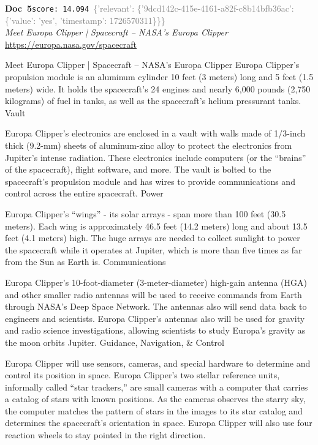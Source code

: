 \documentclass[a4paper,11pt]{article}
\begin{document}
\begin{docenv}
{\footnotesize\textcolor{doccolor}{\textbf{Doc~5}}}\hfill{\tiny\texttt{score:~14.094}}\ {\tiny\textcolor{gray}{\{'relevant': \{'9dcd142c-415e-4161-a82f-c8b14bfb36ac': \{'value': 'yes', 'timestamp': 1726570311\}\}\}}}\\[3pt]
{\small\textit{Meet Europa Clipper | Spacecraft – NASA's Europa Clipper}}\\[2pt]
{\tiny\url{https://europa.nasa.gov/spacecraft}}\\[4pt]
{\footnotesize Meet Europa Clipper | Spacecraft – NASA's Europa Clipper
Europa Clipper’s propulsion module is an aluminum cylinder 10 feet (3 meters) long and 5 feet (1.5 meters) wide. It holds the spacecraft’s 24 engines and nearly 6,000 pounds (2,750 kilograms) of fuel in tanks, as well as the spacecraft’s helium pressurant tanks. 
Vault

Europa Clipper's electronics are enclosed in a vault with walls made of 1/3-inch thick (9.2-mm) sheets of aluminum-zinc alloy to protect the electronics from Jupiter’s intense radiation. These electronics include computers (or the “brains” of the spacecraft), flight software, and more. The vault is bolted to the spacecraft’s propulsion module and has wires to provide communications and control across the entire spacecraft.
Power

Europa Clipper’s “wings” - its solar arrays - span more than 100 feet (30.5 meters). Each wing is approximately 46.5 feet (14.2 meters) long and about 13.5 feet (4.1 meters) high. The huge arrays are needed to collect sunlight to power the spacecraft while it operates at Jupiter, which is more than five times as far from the Sun as Earth is.
Communications 

Europa Clipper’s 10-foot-diameter (3-meter-diameter) high-gain antenna (HGA) and other smaller radio antennas will be used to receive commands from Earth through NASA’s Deep Space Network. The antennas also will send data back to engineers and scientists. Europa Clipper’s antennas also will be used for gravity and radio science investigations, allowing scientists to study Europa’s gravity as the moon orbits Jupiter.
Guidance, Navigation, \& Control

Europa Clipper will use sensors, cameras, and special hardware to determine and control its position in space. Europa Clipper’s two stellar reference units, informally called “star trackers,” are small cameras with a computer that carries a catalog of stars with known positions. 
As the cameras observes the starry sky, the computer matches the pattern of stars in the images to its star catalog and determines the spacecraft's orientation in space. Europa Clipper will also use four reaction wheels to stay pointed in the right direction.}
\end{docenv}
\end{document}

